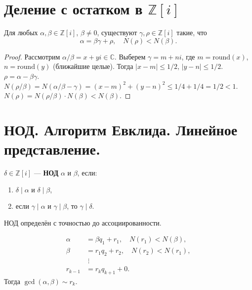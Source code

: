 \documentclass[12pt]{article}
\begin{document}
\section{Деление с остатком в $\mathbb{Z}[i]$}

\begin{theorem}
Для любых $\alpha, \beta \in \mathbb{Z}[i]$, $\beta \neq 0$,
существуют $\gamma, \rho \in \mathbb{Z}[i]$ такие, что
\[
\alpha = \beta\gamma + \rho, \quad N(\rho) < N(\beta).
\]
\end{theorem}

\begin{proof}
Рассмотрим $\alpha/\beta = x + yi \in \mathbb{C}$.
Выберем $\gamma = m + ni$, где $m = \mathrm{round}(x)$,
$n = \mathrm{round}(y)$ (ближайшие целые).
Тогда $|x - m| \leq 1/2$, $|y - n| \leq 1/2$.
$\rho = \alpha - \beta\gamma$.
$N(\rho/\beta) = N(\alpha/\beta - \gamma) = (x-m)^2 + (y-n)^2 \leq 1/4 + 1/4 = 1/2 < 1$.
$N(\rho) = N(\rho/\beta) \cdot N(\beta) < N(\beta)$.
\end{proof}

\section{НОД. Алгоритм Евклида. Линейное представление.}

\begin{definition}
$\delta \in \mathbb{Z}[i]$ --- \textbf{НОД} $\alpha$ и $\beta$, если:
\begin{enumerate}[(1)]
\item $\delta \mid \alpha$ и $\delta \mid \beta$,
\item если $\gamma \mid \alpha$ и $\gamma \mid \beta$, то $\gamma \mid \delta$.
\end{enumerate}
НОД определён с точностью до ассоциированности.
\end{definition}

\begin{method}
\begin{align*}
\alpha &= \beta q_1 + r_1, \quad N(r_1) < N(\beta), \\
\beta &= r_1 q_2 + r_2, \quad N(r_2) < N(r_1), \\
&\;\vdots\\
r_{k-1} &= r_k q_{k+1} + 0.
\end{align*}
Тогда $\gcd(\alpha,\beta) \sim r_k$.
\end{method}
\end{document}
